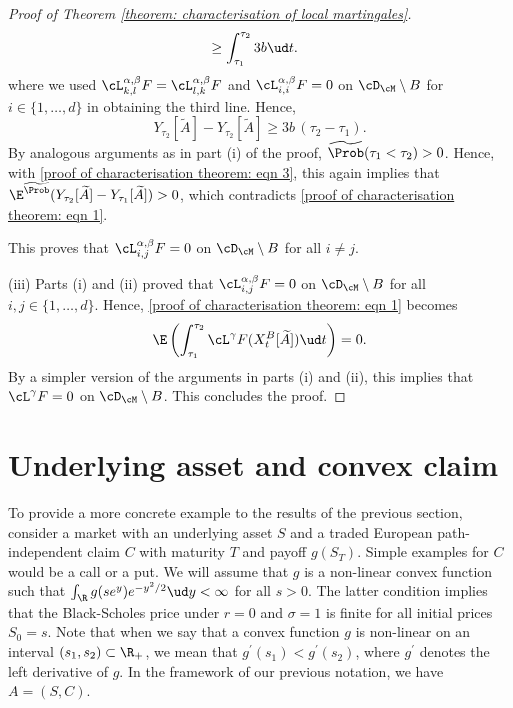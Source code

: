\documentclass[11pt]{article}
\begin{document}
\begin{proof}[Proof of Theorem \ref{theorem: characterisation of local martingales}]
\begin{align*}
& \geq \int_{\tau_1}^{\tau_2} 3b \ud t.
\end{align*}
where we used $\cL^{\alpha,\beta}_{k,l} F = \cL^{\alpha,\beta}_{l,k} F$ and $\cL^{\alpha,\beta}_{i,i} F = 0$ on $\cD_\cM \setminus B$ for $i \in \{1,\ldots,d\}$ in obtaining the third line. Hence,
\begin{equation}
\label{proof of characterisation theorem: eqn 3}
Y_{\tau_2}[\widetilde{A}] - Y_{\tau_2}[\widetilde{A}] \geq 3b \, (\tau_2 - \tau_1).
\end{equation}
By analogous arguments as in part (i) of the proof, $\widetilde{\Prob}(\tau_1 < \tau_2) > 0$. Hence, with \eqref{proof of characterisation theorem: eqn 3}, this again implies that $\E^{\widetilde{\Prob}}(Y_{\tau_2}[\widetilde{A}] - Y_{\tau_1}[\widetilde{A}]) > 0$, which contradicts \eqref{proof of characterisation theorem: eqn 1}.

This proves that $\cL^{\alpha,\beta}_{i,j} F = 0$ on $\cD_{\cM} \setminus B$ for all $i \neq j$.

\item (iii) Parts (i) and (ii) proved that $\cL^{\alpha,\beta}_{i,j} F = 0$ on $\cD_{\cM} \setminus B$ for all $i,j \in \{1,\ldots,d\}$. Hence, \eqref{proof of characterisation theorem: eqn 1} becomes
$$
\E\left( \int_{\tau_1}^{\tau_2} \cL^\gamma F(X^B_t[\widetilde{A}]) \ud t \right) = 0.
$$
By a simpler version of the arguments in parts (i) and (ii), this implies that $\cL^\gamma F = 0$ on $\cD_{\cM} \setminus B$. This concludes the proof.
\end{proof}

\section{Underlying asset and convex claim}
\label{section: convex claim}

To provide a more concrete example to the results of the previous section, consider a market with an underlying asset $S$ and a traded European path-independent claim $C$ with maturity $T$ and payoff $g(S_T)$. Simple examples for $C$ would be a call or a put. We will assume that $g$ is a non-linear convex function such that $\int_\R g(s e^{y}) e^{-y^2/2} \ud y < \infty$ for all $s > 0$. The latter condition implies that the Black-Scholes price under $r=0$ and $\sigma=1$ is finite for all initial prices $S_0 = s$. 
Note that when we say that a convex function $g$ is non-linear on an interval $(s_1,s_2) \subset \R_+$, we mean that $g^\prime(s_1) < g^\prime(s_2)$, where $g^\prime$ denotes the left derivative of $g$. In the framework of our previous notation, we have $A = (S,C)$.
\end{document}

